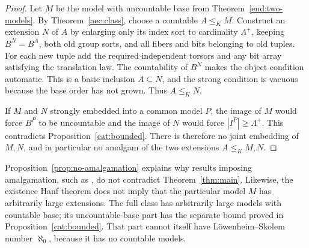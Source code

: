 \begin{proof}
Let \(M\) be the model with uncountable base from
Theorem~\ref{end:two-models}. By Theorem~\ref{aec:class}, choose a
countable \(A\le_K M\). Construct an extension \(N\) of \(A\) by
enlarging only its index sort to cardinality \(\Lambda^+\), keeping
\(B^N=B^A\), both old group sorts, and all fibers and bits belonging
to old tuples. For each new tuple add the required independent torsors
and any bit array satisfying the translation law. The countability of
\(B^N\) makes the object condition automatic. This is a basic
inclusion \(A\subseteq N\), and the strong condition is vacuous
because the base order has not grown. Thus \(A\le_K N\).

If \(M\) and \(N\) strongly embedded into a common model \(P\),
the image of \(M\) would force \(B^P\) to be uncountable and the image
of \(N\) would force \(|I^P|\ge\Lambda^+\).
This contradicts Proposition~\ref{cat:bounded}.
There is therefore no joint embedding of \(M,N\), and in particular
no amalgam of the two extensions \(A\le_K M,N\).
\end{proof}

Proposition~\ref{prop:no-amalgamation} explains why results imposing
amalgamation, such as \cite[Corollary~9.10]{Vasey2017Downward}, do not
contradict Theorem~\ref{thm:main}. Likewise, the existence Hanf theorem
does not imply that the particular model \(M\) has arbitrarily large
extensions. The full class has arbitrarily large models with countable
base; its uncountable-base part has the separate bound proved in
Proposition~\ref{cat:bounded}. That part cannot itself have
L\"owenheim--Skolem number \(\aleph_0\), because it has no countable
models.
